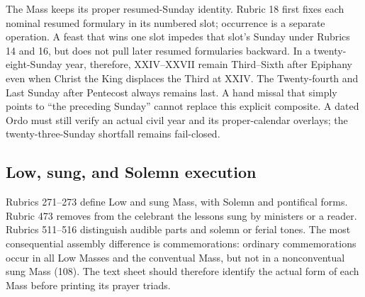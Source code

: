 The Mass keeps its proper resumed-Sunday identity. Rubric 18 first fixes each nominal resumed
formulary in its numbered slot; occurrence is a separate operation. A feast that wins one slot
impedes that slot's Sunday under Rubrics 14 and 16, but does not pull later resumed formularies
backward. In a twenty-eight-Sunday year, therefore, XXIV--XXVII remain Third--Sixth after
Epiphany even when Christ the King displaces the Third at XXIV. The Twenty-fourth and Last
Sunday after Pentecost always remains last. A hand missal that simply points to “the preceding
Sunday” cannot replace this explicit composite. A dated Ordo must still verify an actual civil
year and its proper-calendar overlays; the twenty-three-Sunday shortfall remains fail-closed.

\subsection{Low, sung, and Solemn execution}

Rubrics 271--273 define Low and sung Mass, with Solemn and pontifical forms. Rubric 473 removes from the celebrant the lessons sung by ministers or a reader. Rubrics 511--516 distinguish audible parts and solemn or ferial tones. The most consequential assembly difference is commemorations: ordinary commemorations occur in all Low Masses and the conventual Mass, but not in a nonconventual sung Mass (108). The text sheet should therefore identify the actual form of each Mass before printing its prayer triads.

